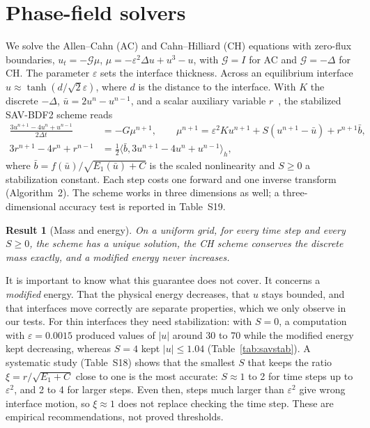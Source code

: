\documentclass[preprint,12pt]{elsarticle}
\newtheorem{result}{Result}
\theoremstyle{remark}
\begin{document}
\section{Phase-field solvers}\label{sec:pf}
We solve the Allen--Cahn (AC) and Cahn--Hilliard (CH) equations with zero-flux boundaries,
$u_t=-\mathcal G\mu$, $\mu=-\varepsilon^2\Delta u+u^3-u$, with $\mathcal G=I$ for AC and $\mathcal G=-\Delta$
for CH. The parameter $\varepsilon$ sets the interface thickness. Across an equilibrium interface
$u\approx\tanh(d/\sqrt2\varepsilon)$, where $d$ is the distance to the interface. With $K$ the discrete
$-\Delta$, $\bar u=2u^n-u^{n-1}$, and a scalar auxiliary variable $r$~\cite{shen2018scalar}, the
stabilized SAV-BDF2 scheme reads
\begin{align}
\frac{3u^{n+1}-4u^n+u^{n-1}}{2\Delta t}&=-G\mu^{n+1},\qquad
\mu^{n+1}=\varepsilon^2Ku^{n+1}+S(u^{n+1}-\bar u)+r^{n+1}\bar b,\label{eq:sav1}\\
3r^{n+1}-4r^n+r^{n-1}&=\tfrac12\langle\bar b,3u^{n+1}-4u^n+u^{n-1}\rangle_h,\label{eq:sav2}
\end{align}
where $\bar b=f(\bar u)/\sqrt{E_1(\bar u)+C}$ is the scaled nonlinearity and $S\ge0$ a stabilization
constant. Each step costs one forward and one inverse transform (Algorithm~2). The scheme works in three dimensions
as well; a three-dimensional accuracy test is reported in Table~S19.

\begin{result}[Mass and energy]\label{thm:energy}
On a uniform grid, for every time step and every $S\ge0$, the scheme has a unique solution, the CH scheme
conserves the discrete mass exactly, and a modified energy never increases.
\end{result}

It is important to know what this guarantee does not cover. It concerns a \emph{modified} energy. That
the physical energy decreases, that $u$ stays bounded, and that interfaces move correctly are separate
properties, which we only observe in our tests. For thin interfaces they need stabilization: with
$S=0$, a computation with $\varepsilon=0.0015$ produced values of $|u|$ around 30 to 70 while the
modified energy kept decreasing, whereas $S=4$ kept $|u|\le1.04$ (Table~\ref{tab:savstab}). A systematic study (Table~S18) shows that the smallest $S$ that keeps the ratio $\xi=r/\sqrt{E_1+C}$
close to one is the most accurate: $S\approx1$ to 2 for time steps up to $\varepsilon^2$, and 2 to 4 for
larger steps. Even then, steps much larger than $\varepsilon^2$ give wrong interface motion, so $\xi\approx1$
does not replace checking the time step. These are empirical recommendations, not proved thresholds.
\end{document}
